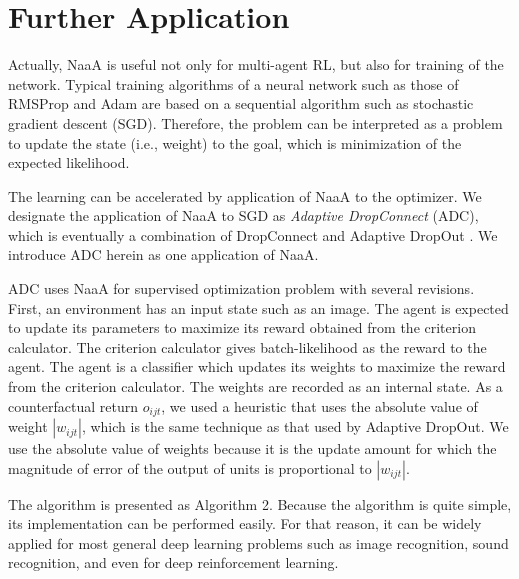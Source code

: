 \section{Further Application}
Actually, NaaA is useful not only for multi-agent RL, but also for training of the network.
Typical training algorithms of a neural network such as those of RMSProp \citep{tieleman2012lecture} and Adam \citep{kingma2014adam} are based on a sequential algorithm such as stochastic gradient descent (SGD).
Therefore, the problem can be interpreted as a problem to update the state (i.e., weight) to the goal, which is minimization of the expected likelihood.

The learning can be accelerated by application of NaaA to the optimizer.
We designate the application of NaaA to SGD as {\em Adaptive DropConnect} (ADC), 
which is eventually a combination of DropConnect \citep{wan2013regularization} and Adaptive DropOut \citep{ba2013adaptive}.
We introduce ADC herein as one application of NaaA.

ADC uses NaaA for supervised optimization problem with several revisions.
First, an environment has an input state such as an image. The agent is expected to update its parameters to maximize its reward obtained from the criterion calculator.
The criterion calculator gives batch-likelihood as the reward to the agent.
The agent is a classifier which updates its weights to maximize the reward from the criterion calculator.
The weights are recorded as an internal state.
As a counterfactual return $o_{ijt}$, we used a heuristic that uses the absolute value of weight $|w_{ijt}|$, which is the
same technique as that used by Adaptive DropOut.
We use the absolute value of weights because it is the update amount for which the magnitude of error of the output of units is proportional to $|w_{ijt}|$.

The algorithm is presented as Algorithm 2.
Because the algorithm is quite simple, its implementation can be performed easily.
For that reason, it can be widely applied for most general deep learning problems such as 
image recognition, sound recognition, and even for deep reinforcement learning.

